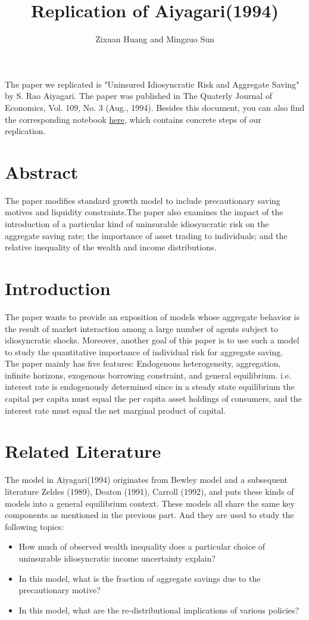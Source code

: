 \documentclass[]{article}
\title{Replication of Aiyagari(1994)}
\author{Zixuan Huang and Mingzuo Sun}
\date{}
\begin{document}
\linespread{2}
\maketitle
The paper we replicated is "Uninsured Idiosyncratic Risk and Aggregate Saving" by S. Rao Aiyagari. The paper was published in The Quaterly Journal of Economics, Vol. 109, No. 3 (Aug., 1994). Besides this document, you can also find the corresponding notebook \href{run:../Aiyagari1994QJE.ipynb}{here}, which contains concrete steps of our replication.

\section{Abstract}
The paper modifies standard growth model to include precautionary saving motives and liquidity constraints.The paper also examines the impact of the introduction of a particular kind of uninsurable idiosyncratic risk on the aggregate saving rate; the importance of asset trading to individuals; and the relative inequality of the wealth and income distributions. 

\section{Introduction}
The paper wants to provide an exposition of models whose aggregate behavior is the result of market interaction among a large number of agents subject to idiosyncratic shocks. Moreover, another goal of this paper is to use such a model to study the quantitative importance of individual risk for aggregate saving.\\

The paper mainly has five features: Endogenous heterogeneity, aggregation, infinite horizons, exogenous borrowing constraint, and general equilibrium. i.e. interest rate is endogenously determined since in a steady state equilibrium the capital per capita must equal the per capita asset holdings of consumers, and the interest rate must equal the net marginal product of capital. 

\section{Related Literature}
The model in Aiyagari(1994) originates from Bewley model and a subsequent literature Zeldes (1989), Deaton (1991), Carroll (1992), and puts these kinds of models into a general equilibrium context. These models all share the same key components as mentioned in the previous part. And they are used to study the following topics:
\begin{itemize}
	\item How much of observed wealth inequality does a particular choice of uninsurable idiosyncratic income uncertainty explain? 
	\item In this model, what is the fraction of aggregate savings due to the precautionary motive? 
	\item In this model, what are the re-distributional implications of various policies?
\end{itemize}
\end{document}
